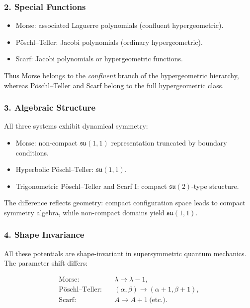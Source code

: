 \documentclass[11pt]{article}
\begin{document}
\subsubsection*{2. Special Functions}

\begin{itemize}
\item Morse: associated Laguerre polynomials (confluent hypergeometric).
\item Pöschl--Teller: Jacobi polynomials (ordinary hypergeometric).
\item Scarf: Jacobi polynomials or hypergeometric functions.
\end{itemize}

Thus Morse belongs to the \emph{confluent} branch of the
hypergeometric hierarchy, whereas Pöschl--Teller and Scarf
belong to the full hypergeometric class.

\subsubsection*{3. Algebraic Structure}

All three systems exhibit dynamical symmetry:

\begin{itemize}
\item Morse: non-compact $\mathfrak{su}(1,1)$ representation
      truncated by boundary conditions.
\item Hyperbolic Pöschl--Teller: $\mathfrak{su}(1,1)$.
\item Trigonometric Pöschl--Teller and Scarf I:
      compact $\mathfrak{su}(2)$-type structure.
\end{itemize}

The difference reflects geometry:
compact configuration space leads to compact symmetry algebra,
while non-compact domains yield $\mathfrak{su}(1,1)$.

\subsubsection*{4. Shape Invariance}

All these potentials are shape-invariant in supersymmetric
quantum mechanics. The parameter shift differs:

\begin{align}
\text{Morse:} & \quad \lambda \to \lambda - 1, \\
\text{Pöschl--Teller:} & \quad (\alpha,\beta)\to(\alpha+1,\beta+1), \\
\text{Scarf:} & \quad A\to A+1 \ \text{(etc.)}.
\end{align}
\end{document}
